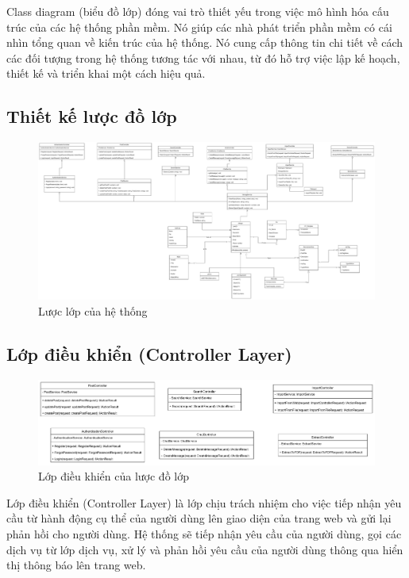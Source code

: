 Class diagram (biểu đồ lớp) đóng vai trò thiết yếu trong việc mô hình hóa cấu trúc của các hệ thống phần mềm. Nó giúp các nhà phát triển phần mềm có cái nhìn tổng quan về kiến trúc của hệ thống. Nó cung cấp thông tin chi tiết về cách các đối tượng trong hệ thống tương tác với nhau, từ đó hỗ trợ việc lập kế hoạch, thiết kế và triển khai một cách hiệu quả.




\subsection{Thiết kế lược đồ lớp}

\begin{figure}[H]

	\centering
    \includegraphics[angle = 90,scale=0.05]{img/ClassDiagram.png}
    \caption{Lược lớp của hệ thống}
\end{figure}




\subsection{Lớp điều khiển (Controller Layer)}

\begin{figure}[H]

	\centering
    \includegraphics[scale=0.08]{img/Controller_view.png}
    \caption{Lớp điều khiển của lược đồ lớp}
\end{figure}

Lớp điều khiển (Controller Layer) là lớp chịu trách nhiệm cho việc tiếp nhận yêu cầu từ hành động cụ thể của người dùng lên giao diện của trang web và gửi lại phản hồi cho người dùng. Hệ thống sẽ tiếp nhận yêu cầu của người dùng, gọi các dịch vụ từ lớp dịch vụ, xử lý và phản hồi yêu cầu của người dùng thông qua hiển thị thông báo lên trang web.



